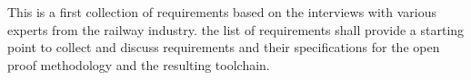 This is a first collection of requirements based on the interviews with various experts from the railway industry. the list of requirements shall provide a starting point to collect and discuss requirements and their specifications for the open proof methodology and the resulting toolchain.
